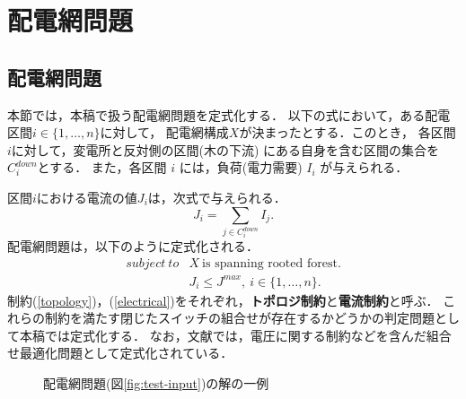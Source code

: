 \section{配電網問題}\label{chap:problem}
\subsection{配電網問題}
本節では，本稿で扱う配電網問題を定式化する．
以下の式において，ある配電区間$i\in\{1,\ldots,n\}$に対して，
配電網構成$X$が決まったとする．このとき，
各区間$i$に対して，変電所と反対側の区間(木の下流)
にある自身を含む区間の集合を$C_i^{down}$とする．
また，各区間 $i$ には，負荷(電力需要) $I_i$%
が与えられる．

区間$i$における電流の値$J_i$は，次式で与えられる．
\begin{equation}
\label{current} 
 J_i = \sum_{j\in C_i^{down}} I_j.
\end{equation}
%
%
配電網問題は，以下のように定式化される．
\begin{eqnarray}
\label{topology}
subject~to & X ~\text{is spanning rooted forest}.\\
\label{electrical}
 & J_i \leq J^{max},
~ i \in \{1,\ldots,n\}.
\end{eqnarray}
制約(\ref{topology})，(\ref{electrical})をそれぞれ，\textbf{トポロジ制約}と\textbf{電流制約}と呼ぶ．
これらの制約を満たす閉じたスイッチの組合せが存在するかどうかの判定問題として本稿では定式化する．
なお，文献\cite{Minato:dnet:ZDD}では，電圧に関する制約などを含んだ組合せ最適化問題として定式化されている．

\begin{figure}[tbp]
 \centering
 \scalebox{0.6}{}
 \caption{配電網問題(図\ref{fig:test-input})の解の一例}
 \label{fig:test-output}
\end{figure}

